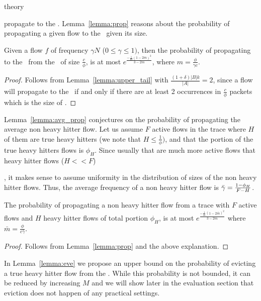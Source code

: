 \begin{maybeappendix}{theory}

propagate to the \cs. Lemma~\ref{lemma:prop} reasons about the probability of propagating a given flow to the \cs\ given its size.

\begin{lemma}
\label{lemma:prop}
Given a flow $f$ of frequency $\gamma N$ ($0\leq \gamma \leq 1)$, then the probability of propagating to the \cs\  from the \sfa\ of size $\frac{c}{\phi}$, is at most $e^{\frac{-\frac{1}{m}(1-2m)^2}{3-2m}}$, where $m=\frac{\phi}{\gamma c}$.
\end{lemma}
\begin{proof}
Follows from Lemma~\ref{lemma:upper_tail} with $\frac{(1+\delta)|B|k}{|A|}=2$, since a flow will propagate to the \cs\ if and only if there are at least 2 occurrences in $\frac{c}{\phi}$ packets which is the size of \sfa.
\end{proof}

Lemma~\ref{lemma:avg_prop} conjectures on the probability of propagating the average non heavy hitter flow. Let us assume $F$ active flows in the trace where $H$ of them are true heavy hitters (we note that $H\leq\frac{1}{\phi})$, and that the portion of the true heavy hitters flows is $\phi_H$. Since usually that are much more active flows that heavy hitter flows ($H<<F$) , it makes sense to assume uniformity in the distribution of sizes of the non heavy hitter flows. Thus, the average frequency of a non heavy hitter flow is $\Bar{\gamma} = \frac{1-\phi_H}{F-H}$.

\begin{lemma}
\label{lemma:avg_prop}
The probability of propagating a non heavy hitter flow from a trace with $F$ active flows and $H$ heavy hitter flows of total portion $\phi_H$, is at most
$e^{\frac{-\frac{1}{\bar{m}}(1-2\bar{m})^2}{3-2\bar{m}}}$ where $\bar{m}=\frac{\phi}{c\bar{\gamma}}$.
\end{lemma}
\begin{proof}
Follows from Lemma~\ref{lemma:prop} and the above explanation.
\end{proof}

In Lemma~\ref{lemma:eve} we propose an upper bound on the probability of evicting a true heavy hitter flow from the \cs. While this probability is not bounded, it can be reduced by increasing $M$ and we will show later in the evaluation section that eviction does not happen of any practical settings. 


\end{maybeappendix}
